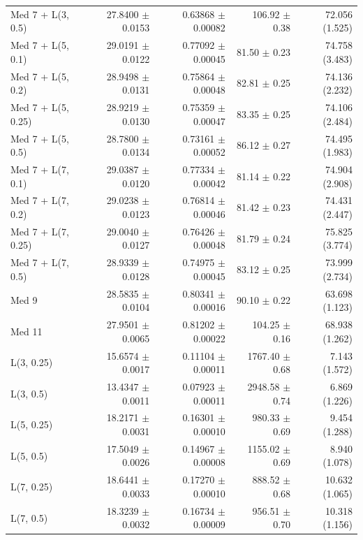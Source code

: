 \begin{longtable}{lrrrr}
Med 7 + L(3, 0.5) & 27.8400 $\pm$ 0.0153 & 0.63868 $\pm$ 0.00082 & 106.92 $\pm$ 0.38 & 72.056 (1.525) \\
Med 7 + L(5, 0.1) & 29.0191 $\pm$ 0.0122 & 0.77092 $\pm$ 0.00045 & 81.50 $\pm$ 0.23 & 74.758 (3.483) \\
Med 7 + L(5, 0.2) & 28.9498 $\pm$ 0.0131 & 0.75864 $\pm$ 0.00048 & 82.81 $\pm$ 0.25 & 74.136 (2.232) \\
Med 7 + L(5, 0.25) & 28.9219 $\pm$ 0.0130 & 0.75359 $\pm$ 0.00047 & 83.35 $\pm$ 0.25 & 74.106 (2.484) \\
Med 7 + L(5, 0.5) & 28.7800 $\pm$ 0.0134 & 0.73161 $\pm$ 0.00052 & 86.12 $\pm$ 0.27 & 74.495 (1.983) \\
Med 7 + L(7, 0.1) & 29.0387 $\pm$ 0.0120 & 0.77334 $\pm$ 0.00042 & 81.14 $\pm$ 0.22 & 74.904 (2.908) \\
Med 7 + L(7, 0.2) & 29.0238 $\pm$ 0.0123 & 0.76814 $\pm$ 0.00046 & 81.42 $\pm$ 0.23 & 74.431 (2.447) \\
Med 7 + L(7, 0.25) & 29.0040 $\pm$ 0.0127 & 0.76426 $\pm$ 0.00048 & 81.79 $\pm$ 0.24 & 75.825 (3.774) \\
Med 7 + L(7, 0.5) & 28.9339 $\pm$ 0.0128 & 0.74975 $\pm$ 0.00045 & 83.12 $\pm$ 0.25 & 73.999 (2.734) \\
Med 9 & 28.5835 $\pm$ 0.0104 & 0.80341 $\pm$ 0.00016 & 90.10 $\pm$ 0.22 & 63.698 (1.123) \\
Med 11 & 27.9501 $\pm$ 0.0065 & 0.81202 $\pm$ 0.00022 & 104.25 $\pm$ 0.16 & 68.938 (1.262) \\
L(3, 0.25) & 15.6574 $\pm$ 0.0017 & 0.11104 $\pm$ 0.00011 & 1767.40 $\pm$ 0.68 & 7.143 (1.572) \\
L(3, 0.5) & 13.4347 $\pm$ 0.0011 & 0.07923 $\pm$ 0.00011 & 2948.58 $\pm$ 0.74 & 6.869 (1.226) \\
L(5, 0.25) & 18.2171 $\pm$ 0.0031 & 0.16301 $\pm$ 0.00010 & 980.33 $\pm$ 0.69 & 9.454 (1.288) \\
L(5, 0.5) & 17.5049 $\pm$ 0.0026 & 0.14967 $\pm$ 0.00008 & 1155.02 $\pm$ 0.69 & 8.940 (1.078) \\
L(7, 0.25) & 18.6441 $\pm$ 0.0033 & 0.17270 $\pm$ 0.00010 & 888.52 $\pm$ 0.68 & 10.632 (1.065) \\
L(7, 0.5) & 18.3239 $\pm$ 0.0032 & 0.16734 $\pm$ 0.00009 & 956.51 $\pm$ 0.70 & 10.318 (1.156) \\
\end{longtable}
\endgroup
